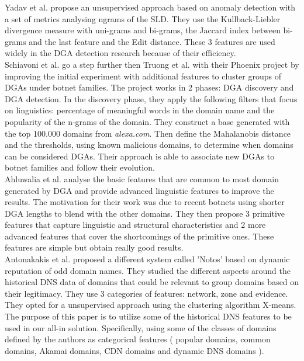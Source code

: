 Yadav et al. \cite{dga2} propose an unsupervised approach based on anomaly detection with a set of metrics analysing ngrams of the SLD. They use the Kullback-Liebler divergence measure with uni-grams and bi-grams, the Jaccard index between bi-grams and the last feature and the Edit distance. These 3 features are used widely in the DGA detection research because of their efficiency.\\

Schiavoni et al. \cite{phoenix} go a step further then Truong et al. with their Phoenix project by improving the initial experiment with additional features to cluster groups of DGAs under botnet families. The project works in 2 phases: DGA discovery and DGA detection. In the discovery phase, they apply the following filters that focus on linguistics: percentage of meaningful words in the domain name and the popularity of the n-grams of the domain. They construct a base generated with the top 100.000 domains from \textit{alexa.com}. Then define the Mahalanobis distance and the thresholds, using known malicious domains,  to determine when domains can be considered DGAs. Their approach is able to associate new DGAs to botnet families and follow their evolution.\\

Ahluwalia et al. \cite{dga} analyse the basic features that are common to most domain generated by DGA and provide advanced linguistic features to improve the results. The motivation for their work was due to recent botnets using shorter DGA lengths to blend with the other domains. They then propose 3 primitive features that capture linguistic and structural characteristics and 2 more advanced features that cover the shortcomings of the primitive ones. These features are simple but obtain really good results.\\

Antonakakis et al. \cite{dnsreputation} proposed a different system called 'Notos' based on dynamic reputation of odd domain names. They studied the different aspects around the historical DNS data of domains that could be relevant to group domains based on their legitimacy. They use 3 categories of features: network, zone and evidence. They opted for a unsupervised approach using the clustering algorithm X-means. The purpose of this paper is to utilize some of the historical DNS features to be used in our all-in solution. Specifically, using some of the classes of domains defined by the authors as categorical features ( popular domains, common domains, Akamai domains,  CDN domains and dynamic DNS domains ).\\

